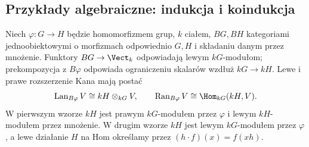 \subsection{Przykłady algebraiczne: indukcja i koindukcja}
\begin{twierdzenie}\label{cat:thm:kan-group-modules}
Niech $\varphi:G\to H$ będzie homomorfizmem grup, $k$ ciałem, $BG,BH$ kategoriami jednoobiektowymi o morfizmach odpowiednio $G,H$ i składaniu danym przez mnożenie. Funktory $BG\to\Vect_k$ odpowiadają lewym $kG$-modułom; prekompozycja z $B\varphi$ odpowiada ograniczeniu skalarów wzdłuż $kG\to kH$. Lewe i prawe rozszerzenie Kana mają postać
\[
 \operatorname{Lan}_{B\varphi}V\cong kH\otimes_{kG}V,\qquad
 \operatorname{Ran}_{B\varphi}V\cong\Hom_{kG}(kH,V).
\]
W pierwszym wzorze $kH$ jest prawym $kG$-modułem przez $\varphi$ i lewym $kH$-modułem przez mnożenie. W drugim wzorze $kH$ jest lewym $kG$-modułem przez $\varphi$, a lewe działanie $H$ na Hom określamy przez $(h\cdot f)(x)=f(xh)$.
\end{twierdzenie}
